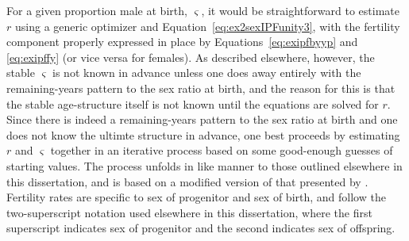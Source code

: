 \label{sec:rexIPFfindr}
For a given proportion male at birth, $\varsigma$, it would be straightforward
to estimate $r$ using a generic optimizer and
Equation~\eqref{eq:ex2sexIPFunity3}, with the fertility component properly
expressed in place by Equations~\eqref{eq:exipfbyyp} and \eqref{eq:exipffy} (or
vice versa for females). As described elsewhere, however, the stable $\varsigma$
is not known in advance unless one does away entirely with the remaining-years
pattern to the sex ratio at birth, and the reason for this is that the stable
age-structure itself is not known until the equations are solved for $r$.
Since there is indeed a remaining-years pattern to the sex ratio at birth and
one does not know the ultimte structure in advance, one best proceeds by
estimating $r$ and $\varsigma$ together in an iterative process based on some 
good-enough guesses of starting values. The process unfolds in like manner to 
those outlined elsewhere in this dissertation, and is based on a modified version 
of that presented by \citet{coale1957new}.
Fertility rates are specific to sex of progenitor and sex of birth, and follow
the two-superscript notation used elsewhere in this dissertation, where the
first superscript indicates sex of progenitor and the second indicates sex of
offspring.

